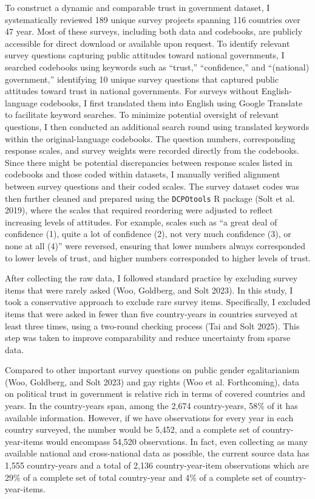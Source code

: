 \documentclass[
  12pt,
]{article}
\begin{document}
To construct a dynamic and comparable trust in government dataset, I systematically reviewed 189 unique survey projects spanning 116 countries over 47 year.
Most of these surveys, including both data and codebooks, are publicly accessible for direct download or available upon request.
To identify relevant survey questions capturing public attitudes toward national governments, I searched codebooks using keywords such as ``trust,'' ``confidence,'' and ``(national) government,'' identifying 10 unique survey questions that captured public attitudes toward trust in national governments.
For surveys without English-language codebooks, I first translated them into English using Google Translate to facilitate keyword searches.
To minimize potential oversight of relevant questions, I then conducted an additional search round using translated keywords within the original-language codebooks.
The question numbers, corresponding response scales, and survey weights were recorded directly from the codebooks.
Since there might be potential discrepancies between response scales listed in codebooks and those coded within datasets, I manually verified alignment between survey questions and their coded scales.
The survey dataset codes was then further cleaned and prepared using the \texttt{DCPOtools} R package (Solt et al. 2019), where the scales that required reordering were adjusted to reflect increasing levels of attitudes.
For example, scales such as ``a great deal of confidence (1), quite a lot of confidence (2), not very much confidence (3), or none at all (4)'' were reversed, ensuring that lower numbers always corresponded to lower levels of trust, and higher numbers corresponded to higher levels of trust.

After collecting the raw data, I followed standard practice by excluding survey items that were rarely asked (Woo, Goldberg, and Solt 2023).
In this study, I took a conservative approach to exclude rare survey items.
Specifically, I excluded items that were asked in fewer than five country-years in countries surveyed at least three times, using a two-round checking process (Tai and Solt 2025).
This step was taken to improve comparability and reduce uncertainty from sparse data.

Compared to other important survey questions on public gender egalitarianism (Woo, Goldberg, and Solt 2023) and gay rights (Woo et al. Forthcoming), data on political trust in government is relative rich in terms of covered countries and years.
In the country-years span, among the 2,674 country-years, 58\% of it has available information.
However, if we have observations for every year in each country surveyed, the number would be 5,452, and a complete set of country-year-items would encompass 54,520 observations.
In fact, even collecting as many available national and cross-national data as possible, the current source data has 1,555 country-years and a total of 2,136 country-year-item observations which are 29\% of a complete set of total country-year and 4\% of a complete set of country-year-items.
\end{document}
